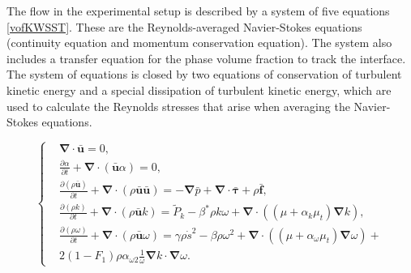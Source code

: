 \documentclass[mathematics,article,submit,pdftex,moreauthors]{Definitions/mdpi}
\begin{document}
The flow in the experimental setup is described by a system of five equations \eqref{vofKWSST}. These are the Reynolds-averaged Navier-Stokes equations (continuity equation and momentum conservation equation). The system also includes a transfer equation for the phase volume fraction to track the interface. The system of equations is closed by two equations of conservation of turbulent kinetic energy and a special dissipation of turbulent kinetic energy, which are used to calculate the Reynolds stresses that arise when averaging the Navier-Stokes equations.

\begin{linenomath}
\begin{equation}
	\label{vofKWSST}
	\left\{
		\begin{aligned}
			&\boldsymbol{\nabla} \cdot \bar{\boldsymbol{u}} = 0,\\
			&\frac{\partial \alpha}{\partial t} + \boldsymbol{\nabla} \cdot (\bar{\boldsymbol{u}} \alpha) = 0,\\
			&\frac{\partial (\rho \bar{\boldsymbol{u}})}{\partial t} + \boldsymbol{\nabla} \cdot (\rho \bar{\boldsymbol{u}} \bar{\boldsymbol{u}}) = -\boldsymbol{\nabla} \bar{p} + \boldsymbol{\nabla} \cdot \bar{\boldsymbol{\tau}} + \rho \bar{\boldsymbol{f}},\\
			&\frac{\partial (\rho k)}{\partial t} + \boldsymbol{\nabla} \cdot (\rho \bar{\boldsymbol{u}} k) = \widetilde{P}_k - \beta^*\rho k \omega + \boldsymbol{\nabla} \cdot \left( (\mu + \alpha_k \mu_t) \boldsymbol{\nabla} k \right),\\
			&\frac{\partial (\rho \omega)}{\partial t}  + \boldsymbol{\nabla} \cdot ( \rho \bar{\boldsymbol{u}} \omega) = \gamma \rho \dot{s}^2 - \beta \rho \omega^2 + \boldsymbol{\nabla} \cdot \left( (\mu + \alpha_\omega \mu_t) \boldsymbol{\nabla} \omega \right) + \\
			&2 (1 - F_1) \rho \alpha_{\omega 2} \frac{1}{\omega} \boldsymbol{\nabla} k \cdot \boldsymbol{\nabla} \omega.
		\end{aligned}
	\right.
\end{equation}
\end{linenomath}
\end{document}
